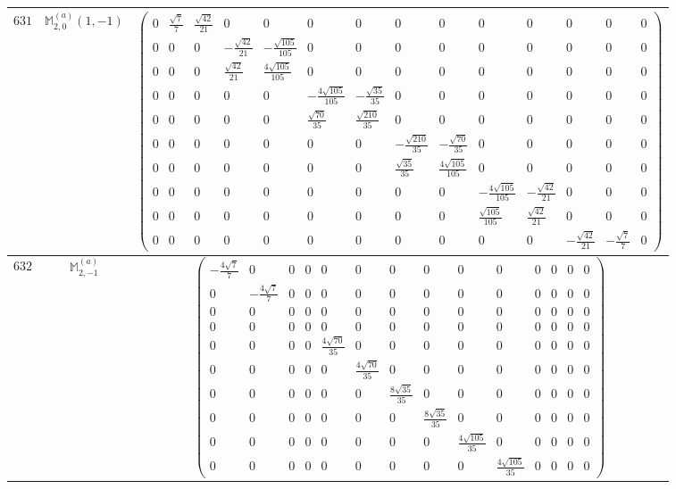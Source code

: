 \documentclass[fleqn,8pt,landscape]{jsarticle}
\begin{document}
\begin{center}
\begin{longtable}{ccc}
$ 631 $ & $ \mathbb{M}_{2,0}^{(a)}(1,-1) $ & $ \begin{pmatrix} 0 & \frac{\sqrt{7}}{7} & \frac{\sqrt{42}}{21} & 0 & 0 & 0 & 0 & 0 & 0 & 0 & 0 & 0 & 0 & 0 \\ 0 & 0 & 0 & - \frac{\sqrt{42}}{21} & - \frac{\sqrt{105}}{105} & 0 & 0 & 0 & 0 & 0 & 0 & 0 & 0 & 0 \\ 0 & 0 & 0 & \frac{\sqrt{42}}{21} & \frac{4 \sqrt{105}}{105} & 0 & 0 & 0 & 0 & 0 & 0 & 0 & 0 & 0 \\ 0 & 0 & 0 & 0 & 0 & - \frac{4 \sqrt{105}}{105} & - \frac{\sqrt{35}}{35} & 0 & 0 & 0 & 0 & 0 & 0 & 0 \\ 0 & 0 & 0 & 0 & 0 & \frac{\sqrt{70}}{35} & \frac{\sqrt{210}}{35} & 0 & 0 & 0 & 0 & 0 & 0 & 0 \\ 0 & 0 & 0 & 0 & 0 & 0 & 0 & - \frac{\sqrt{210}}{35} & - \frac{\sqrt{70}}{35} & 0 & 0 & 0 & 0 & 0 \\ 0 & 0 & 0 & 0 & 0 & 0 & 0 & \frac{\sqrt{35}}{35} & \frac{4 \sqrt{105}}{105} & 0 & 0 & 0 & 0 & 0 \\ 0 & 0 & 0 & 0 & 0 & 0 & 0 & 0 & 0 & - \frac{4 \sqrt{105}}{105} & - \frac{\sqrt{42}}{21} & 0 & 0 & 0 \\ 0 & 0 & 0 & 0 & 0 & 0 & 0 & 0 & 0 & \frac{\sqrt{105}}{105} & \frac{\sqrt{42}}{21} & 0 & 0 & 0 \\ 0 & 0 & 0 & 0 & 0 & 0 & 0 & 0 & 0 & 0 & 0 & - \frac{\sqrt{42}}{21} & - \frac{\sqrt{7}}{7} & 0 \end{pmatrix} $ \\ \hline
$ 632 $ & $ \mathbb{M}_{2,-1}^{(a)} $ & $ \begin{pmatrix} - \frac{4 \sqrt{7}}{7} & 0 & 0 & 0 & 0 & 0 & 0 & 0 & 0 & 0 & 0 & 0 & 0 & 0 \\ 0 & - \frac{4 \sqrt{7}}{7} & 0 & 0 & 0 & 0 & 0 & 0 & 0 & 0 & 0 & 0 & 0 & 0 \\ 0 & 0 & 0 & 0 & 0 & 0 & 0 & 0 & 0 & 0 & 0 & 0 & 0 & 0 \\ 0 & 0 & 0 & 0 & 0 & 0 & 0 & 0 & 0 & 0 & 0 & 0 & 0 & 0 \\ 0 & 0 & 0 & 0 & \frac{4 \sqrt{70}}{35} & 0 & 0 & 0 & 0 & 0 & 0 & 0 & 0 & 0 \\ 0 & 0 & 0 & 0 & 0 & \frac{4 \sqrt{70}}{35} & 0 & 0 & 0 & 0 & 0 & 0 & 0 & 0 \\ 0 & 0 & 0 & 0 & 0 & 0 & \frac{8 \sqrt{35}}{35} & 0 & 0 & 0 & 0 & 0 & 0 & 0 \\ 0 & 0 & 0 & 0 & 0 & 0 & 0 & \frac{8 \sqrt{35}}{35} & 0 & 0 & 0 & 0 & 0 & 0 \\ 0 & 0 & 0 & 0 & 0 & 0 & 0 & 0 & \frac{4 \sqrt{105}}{35} & 0 & 0 & 0 & 0 & 0 \\ 0 & 0 & 0 & 0 & 0 & 0 & 0 & 0 & 0 & \frac{4 \sqrt{105}}{35} & 0 & 0 & 0 & 0 \end{pmatrix} $ \\ \hline

\end{longtable}
\end{center}
\end{document}
